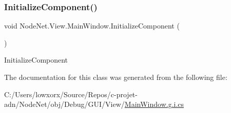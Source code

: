 \subsubsection{\texorpdfstring{Initialize\+Component()}{InitializeComponent()}}
{\footnotesize\ttfamily void Node\+Net.\+View.\+Main\+Window.\+Initialize\+Component (\begin{DoxyParamCaption}{ }\end{DoxyParamCaption})}



Initialize\+Component 



The documentation for this class was generated from the following file\+:\begin{DoxyCompactItemize}
\item 
C\+:/\+Users/lowxorx/\+Source/\+Repos/c-\/projet-\/adn/\+Node\+Net/obj/\+Debug/\+G\+U\+I/\+View/\hyperlink{_main_window_8g_8i_8cs}{Main\+Window.\+g.\+i.\+cs}\end{DoxyCompactItemize}
